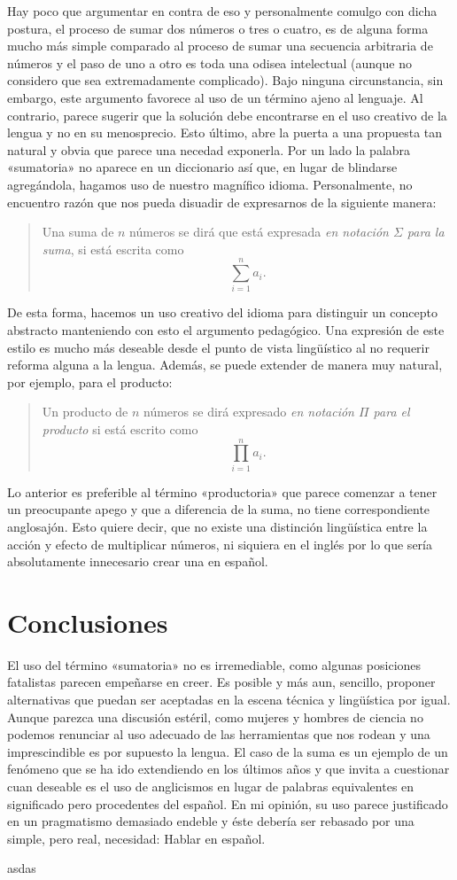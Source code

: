 \documentclass[draft,letter,10pt,notitlepage]{article}
\theoremstyle{definition}
\theoremstyle{remark}
\begin{document}
Hay poco que argumentar en contra de eso y personalmente comulgo con
dicha postura, el proceso de sumar dos números o tres o cuatro, es
de alguna forma mucho más simple comparado al proceso de sumar una 
secuencia arbitraria de números y el paso de uno a otro es toda una odisea
intelectual (aunque no considero que sea extremadamente complicado).
Bajo ninguna circunstancia, sin embargo, este argumento favorece
al uso de un término ajeno al lenguaje. Al contrario, parece
sugerir que la solución debe encontrarse en el uso creativo
de la lengua y no en su menosprecio. Esto último, abre la puerta a una
propuesta tan natural y obvia que parece una necedad exponerla. Por
un lado la palabra «sumatoria» no aparece en un diccionario así que,
en lugar de blindarse agregándola, hagamos uso de nuestro magnífico
idioma. Personalmente, no encuentro razón que nos pueda disuadir de 
expresarnos de la siguiente manera:
\begin{quote}
  Una suma de \( n\) números se dirá que está expresada \emph{en notación
  \( \Sigma\) para la suma}, si está escrita como  \[\sum_{i=1}^n a_i.\]
\end{quote}
De esta forma, hacemos un uso creativo del idioma para distinguir
un concepto abstracto manteniendo con esto el argumento pedagógico.
Una expresión de este estilo es mucho más deseable desde el punto
de vista lingüístico al no requerir reforma alguna a la lengua.
Además, se puede extender de manera muy natural, por ejemplo,
para el producto:
\begin{quote}
  Un producto de \( n\) números se dirá expresado  \emph{en notación
  \( \Pi\) para el producto} si está escrito como
  \[ \prod_{i=1}^n a_i.\]
\end{quote}
Lo anterior es preferible al término «productoria» que parece comenzar
a tener un preocupante apego y que a diferencia de la suma, no tiene
correspondiente anglosajón. Esto quiere decir, que no existe una distinción
lingüística entre la acción y efecto de multiplicar números, ni
siquiera en el inglés por lo que sería absolutamente innecesario crear
una en español.

\section{Conclusiones}
El uso del término «sumatoria» no es irremediable, como algunas
posiciones fatalistas parecen empeñarse en creer. Es posible y más
aun, sencillo, proponer alternativas que puedan ser aceptadas en la
escena técnica y lingüística por igual. Aunque parezca una discusión
estéril, como mujeres y hombres de ciencia no podemos renunciar al uso
adecuado de las herramientas que nos rodean y una imprescindible es
por supuesto la lengua. El caso de la suma es un ejemplo de un
fenómeno que se ha ido extendiendo en los últimos años y que invita a
cuestionar cuan deseable es el uso de anglicismos en lugar de palabras
equivalentes en significado pero procedentes del español. En mi
opinión, su uso parece justificado en un pragmatismo demasiado endeble
y éste debería ser rebasado por una simple, pero real, necesidad:
Hablar en español.

\begin{thebibliography}{}

   asdas 

\end{thebibliography}
\end{document}

